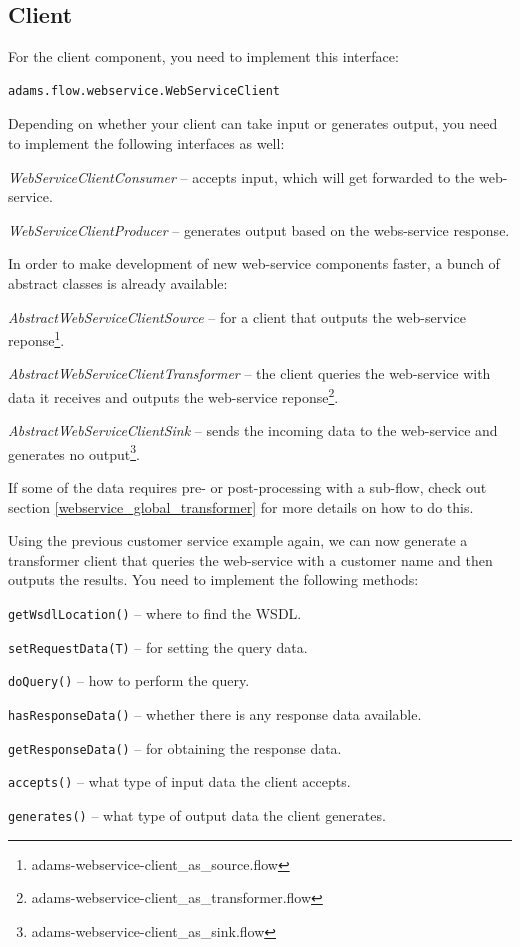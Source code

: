 \documentclass[a4paper]{book}
\begin{document}
\subsection{Client}
For the client component, you need to implement this interface:
\begin{verbatim}
adams.flow.webservice.WebServiceClient
\end{verbatim}
Depending on whether your client can take input or generates output, you need
to implement the following interfaces as well:
\begin{tight_itemize}
	\item \textit{WebServiceClientConsumer} -- accepts input, which will get
	forwarded to the web-service.
	\item \textit{WebServiceClientProducer} -- generates output based on the
	webs-service response.
\end{tight_itemize}
In order to make development of new web-service components faster, a bunch
of abstract classes is already available:
\begin{tight_itemize}
	\item \textit{AbstractWebServiceClientSource} -- for a client that outputs
	the web-service reponse\footnote{adams-webservice-client\_as\_source.flow}.
	\item \textit{AbstractWebServiceClientTransformer} -- the client queries the 
	web-service with data it receives and outputs the web-service 
	reponse\footnote{adams-webservice-client\_as\_transformer.flow}.
	\item \textit{AbstractWebServiceClientSink} -- sends the incoming data
	to the web-service and generates no output\footnote{adams-webservice-client\_as\_sink.flow}.
\end{tight_itemize}
If some of the data requires pre- or post-processing with a sub-flow, check
out section \ref{webservice_global_transformer} for more details on how to do
this.

Using the previous customer service example again, we can now generate a
transformer client that queries the web-service with a customer name and
then outputs the results. You need to implement the following methods:
\begin{tight_itemize}
	\item \texttt{getWsdlLocation()} -- where to find the WSDL.
	\item \texttt{setRequestData(T)} -- for setting the query data.
	\item \texttt{doQuery()} -- how to perform the query.
	\item \texttt{hasResponseData()} -- whether there is any response data
	available.
	\item \texttt{getResponseData()} -- for obtaining the response data.
	\item \texttt{accepts()} -- what type of input data the client accepts.
	\item \texttt{generates()} -- what type of output data the client generates.
\end{tight_itemize}
\end{document}
